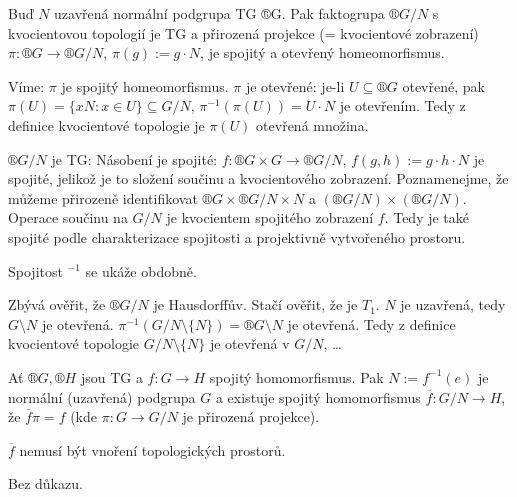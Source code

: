 \documentclass[12pt]{article}                   %
\begin{document}
    \begin{veta}[Faktor TG]
        Buď $N$ uzavřená normální podgrupa TG ®G. Pak faktogrupa $®G / N$ s kvocientovou topologií je TG a přirozená projekce (= kvocientové zobrazení) $\pi: ®G \rightarrow ®G / N$, $\pi(g) := g·N$, je spojitý a otevřený homeomorfismus.

        \begin{dukazin}
            Víme: $\pi$ je spojitý homeomorfismus. $\pi$ je otevřené: je-li $U \subseteq ®G$ otevřené, pak $\pi(U) = \{xN: x \in U\} \subseteq G/N$, $\pi^{-1}(\pi(U)) = U·N$ je otevřením. Tedy z definice kvocientové topologie je $\pi(U)$ otevřená množina.

            $®G/N$ je TG: Násobení je spojité: $f: ®G \times G \rightarrow ®G / N$, $f(g, h) := g·h·N$ je spojité, jelikož je to složení součinu a kvocientového zobrazení. Poznamenejme, že můžeme přirozeně identifikovat $®G \times ®G / N \times N$ a $(®G/N) \times (®G/N)$. Operace součinu na $G/N$ je kvocientem spojitého zobrazení $f$. Tedy je také spojité podle charakterizace spojitosti a projektivně vytvořeného prostoru.

            Spojitost $^{-1}$ se ukáže obdobně.

            Zbývá ověřit, že $®G / N$ je Hausdorffův. Stačí ověřit, že je $T_1$. $N$ je uzavřená, tedy $G\setminus N$ je otevřená. $\pi^{-1}(G / N \setminus \{N\}) = ®G \setminus N$ je otevřená. Tedy z definice kvocientové topologie $G/N \setminus \{N\}$ je otevřená v $G/N$, …
        \end{dukazin}
    \end{veta}


    \begin{tvrzeni}[O homomorfismu]
        Ať $®G, ®H$ jsou TG a $f: G \rightarrow H$ spojitý homomorfismus. Pak $N := f^{-1}(e)$ je normální (uzavřená) podgrupa $G$ a existuje spojitý homomorfismus $\overline{f}: G / N \rightarrow H$, že $\overline{f}\pi = f$ (kde $\pi: G \rightarrow G/N$ je přirozená projekce).

        \begin{poznamkain}
            $\overline{f}$ nemusí být vnoření topologických prostorů.
        \end{poznamkain}

        \begin{dukazin}
            Bez důkazu.
        \end{dukazin}
    \end{tvrzeni}
\end{document}
